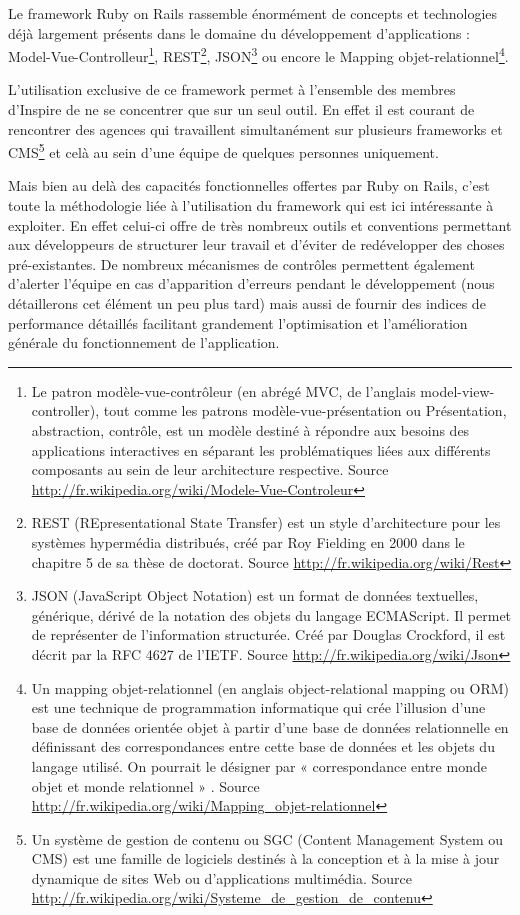 \documentclass[12pt,a4paper]{book}
\begin{document}
Le framework Ruby on Rails rassemble énormément de concepts et technologies déjà largement présents dans le domaine du développement d'applications : Model-Vue-Controlleur\footnote{Le patron modèle-vue-contrôleur (en abrégé MVC, de l'anglais model-view-controller), tout comme les patrons modèle-vue-présentation ou Présentation, abstraction, contrôle, est un modèle destiné à répondre aux besoins des applications interactives en séparant les problématiques liées aux différents composants au sein de leur architecture respective. Source \url{http://fr.wikipedia.org/wiki/Modele-Vue-Controleur}}, REST\footnote{REST (REpresentational State Transfer) est un style d’architecture pour les systèmes hypermédia distribués, créé par Roy Fielding en 2000 dans le chapitre 5 de sa thèse de doctorat. Source \url{http://fr.wikipedia.org/wiki/Rest}}, JSON\footnote{JSON (JavaScript Object Notation) est un format de données textuelles, générique, dérivé de la notation des objets du langage ECMAScript. Il permet de représenter de l’information structurée. Créé par Douglas Crockford, il est décrit par la RFC 4627 de l’IETF. Source \url{http://fr.wikipedia.org/wiki/Json}} ou encore le Mapping objet-relationnel\footnote{Un mapping objet-relationnel (en anglais object-relational mapping ou ORM) est une technique de programmation informatique qui crée l'illusion d'une base de données orientée objet à partir d'une base de données relationnelle en définissant des correspondances entre cette base de données et les objets du langage utilisé. On pourrait le désigner par « correspondance entre monde objet et monde relationnel » . Source \url{http://fr.wikipedia.org/wiki/Mapping_objet-relationnel}}.

L'utilisation exclusive de ce framework permet à l'ensemble des membres d'Inspire de ne se concentrer que sur un seul outil. En effet il est courant de rencontrer des agences qui travaillent simultanément sur plusieurs frameworks et CMS\footnote{Un système de gestion de contenu ou SGC (Content Management System ou CMS) est une famille de logiciels destinés à la conception et à la mise à jour dynamique de sites Web ou d'applications multimédia. Source \url{http://fr.wikipedia.org/wiki/Systeme_de_gestion_de_contenu}} et celà au sein d'une équipe de quelques personnes uniquement.

Mais bien au delà des capacités fonctionnelles offertes par Ruby on Rails, c'est toute la méthodologie liée à l'utilisation du framework qui est ici intéressante à exploiter. En effet celui-ci offre de très nombreux outils et conventions permettant aux développeurs de structurer leur travail et d'éviter de redévelopper des choses pré-existantes. De nombreux mécanismes de contrôles permettent également d'alerter l'équipe en cas d'apparition d'erreurs pendant le développement (nous détaillerons cet élément un peu plus tard) mais aussi de fournir des indices de performance détaillés facilitant grandement l'optimisation et l'amélioration générale du fonctionnement de l'application.
\end{document}

